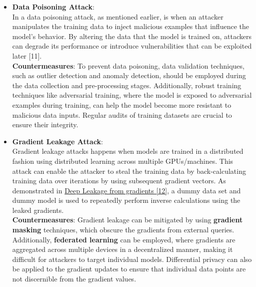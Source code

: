 \documentclass[12pt]{article}
\begin{document}
\begin{itemize}
        \item \textbf{Data Poisoning Attack}: \\
        In a data poisoning attack, as mentioned earlier, is when an attacker manipulates the training data to inject malicious examples that influence the model's behavior. By altering the data that the model is trained on, attackers can degrade its performance or introduce vulnerabilities that can be exploited later [11]. \\
        \textbf{Countermeasures}: To prevent data poisoning, data validation techniques, such as outlier detection and anomaly detection, should be employed during the data collection and pre-processing stages. Additionally, robust training techniques like adversarial training, where the model is exposed to adversarial examples during training, can help the model become more resistant to malicious data inputs. Regular audits of training datasets are crucial to ensure their integrity. \\

        \item \textbf{Gradient Leakage Attack}: \\
        Gradient leakage attacks happens when models are trained in a distributed fashion using distributed learning across multiple GPUs/machines. This attack can enable the attacker to steal the training data by back-calculating training data over iterations by using subsequent gradient vectors.
        As demonstrated in \href{https://arxiv.org/pdf/1906.08935}{Deep Leakage from gradients [12]}, a dummy data set and dummy model is used to repeatedly perform inverse calculations using the leaked gradients. \\
        \textbf{Countermeasures}: Gradient leakage can be mitigated by using \textbf{gradient masking} techniques, which obscure the gradients from external queries. Additionally, \textbf{federated learning} can be employed, where gradients are aggregated across multiple devices in a decentralized manner, making it difficult for attackers to target individual models. Differential privacy can also be applied to the gradient updates to ensure that individual data points are not discernible from the gradient values.
    \end{itemize}
\end{document}
